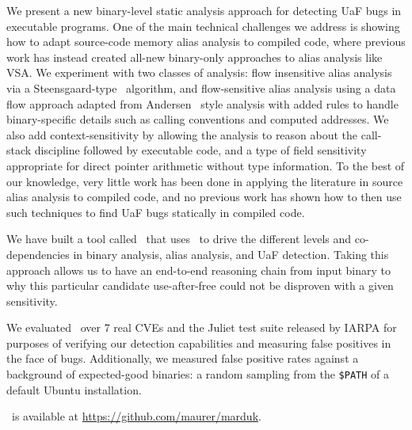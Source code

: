 We present a new binary-level static analysis approach for detecting UaF bugs in executable programs.
One of the main technical challenges we address is showing how to adapt source-code memory alias analysis to compiled code, where previous work has instead created all-new binary-only approaches to alias
analysis like VSA.
We experiment with two classes of analysis: flow insensitive alias analysis via a Steensgaard-type~\cite{steensgaard-alias} algorithm, and  flow-sensitive alias analysis using a data flow approach adapted from Andersen~\cite{andersen} style analysis with added rules to handle binary-specific details such as calling conventions and computed addresses.
We also add context-sensitivity by allowing the analysis to reason about the call-stack discipline followed by executable code, and a type of field sensitivity appropriate for direct pointer arithmetic without type information.
To the best of our knowledge, very little work has been done in applying the literature in source alias analysis to compiled code, and no previous work has shown how to then use such techniques to find UaF bugs statically in compiled code.

We have built a tool called \aliasname\ that uses \sysname\ to drive the different levels and co-dependencies in binary analysis, alias analysis, and UaF detection.
Taking this approach allows us to have an end-to-end reasoning chain from input binary to why this particular candidate use-after-free could not be disproven with a given sensitivity.

We evaluated \aliasname\ over 7 real CVEs and the Juliet test suite released by IARPA for purposes of verifying our detection capabilities and measuring false positives in the face of bugs.
Additionally, we measured false positive rates against a background of expected-good binaries: a random sampling from the \texttt{\$PATH} of a default Ubuntu installation.

\aliasname\ is available at \url{https://github.com/maurer/marduk}.

